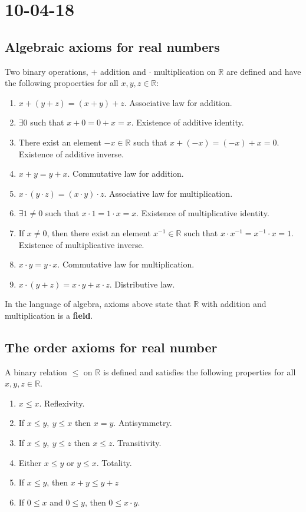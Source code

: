 \documentclass[a4paper,10pt]{article}
\newcommand{\R}{\mathbb{R}}
\begin{document}
\section{10-04-18}

\subsection{Algebraic axioms for real numbers}
Two binary operations, $ + $ addition and $ \cdot $ multiplication on $ \R $ are defined and have the following propoerties for all $ x,y,z \in \R $:
\begin{enumerate}
	\item $ x+(y+z)=(x+y)+z $. Associative law for addition.
	\item $ \exists 0 $ such that $ x+0=0+x=x $. Existence of additive identity.
	\item There exist an element $ -x\in\R $ such that $ x+ (-x) = (-x) + x = 0 $. Existence of additive inverse.
	\item $ x+y = y+x $. Commutative law for addition.
	\item $ x\cdot(y\cdot z)=(x\cdot y)\cdot z $. Associative law for multiplication.
	\item $ \exists 1 \neq 0 $ such that $ x \cdot 1 = 1 \cdot x = x $. Existence of multiplicative identity.
	\item If $ x \neq 0 $, then there exist an element $ x^{-1}\in\R $ such that $ x\cdot x^{-1} = x^{-1} \cdot x = 1 $. Existence of multiplicative inverse.
	\item $ x\cdot y = y\cdot x $. Commutative law for multiplication.
	\item $ x \cdot (y+z) = x \cdot y + x \cdot z $. Distributive law.
\end{enumerate}
In the language of algebra, axioms above state that $ \R $ with addition and multiplication is a \textbf{field}.

\subsection{The order axioms for real number}
A binary relation $ \leq $ on $ \R $ is defined and satisfies the following properties for all $ x,y,z \in \R $.
\begin{enumerate}
	\item $ x \leq x $. Reflexivity.
	\item If $ x \leq y, \ y \leq x $ then $ x=y $. Antisymmetry.
	\item If $ x\leq y, \ y \leq z $ then $ x \leq z $. Transitivity.
	\item Either $ x\leq y $ or $ y \leq x $. Totality.
	\item If $ x \leq y $, then $ x+y \leq y+z $
	\item If $ 0 \leq x $ and $ 0 \leq y $, then $ 0 \leq x \cdot y $.
\end{enumerate} 
\end{document}
